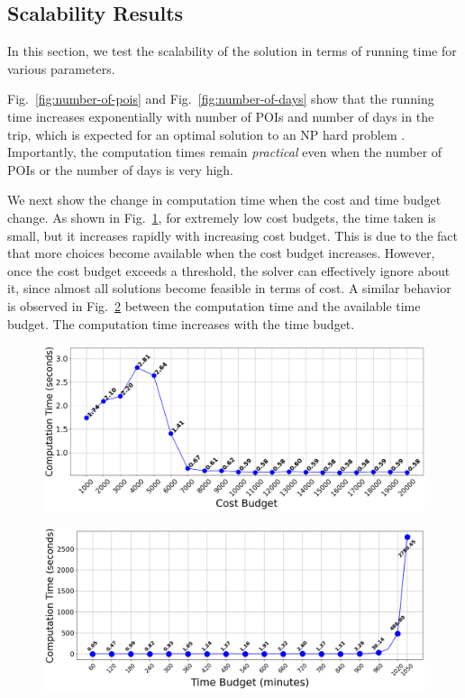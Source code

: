 \subsection{Scalability Results}\label{sec:exp scalability}

In this section, we test the scalability of the \trip solution in terms of running time for various parameters.

Fig.~\ref{fig:number-of-pois} and Fig.~\ref{fig:number-of-days} show that the running time increases exponentially with number of POIs and number of days in the trip, which is expected for an optimal solution to an NP hard problem .
Importantly, the computation times remain \emph{practical} even when the number of POIs or the number of days is very high.

We next show the change in computation time when the cost and time budget change.
As shown in Fig.~\ref{fig:cost-budget}, for extremely low cost budgets, the time taken is small, but it increases rapidly with increasing cost budget. This is due to the fact that more choices become available when the cost budget increases. However, once the cost budget exceeds a threshold, the solver can effectively ignore about it, since almost all solutions become feasible in terms of cost.
A similar behavior is observed in Fig.~\ref{fig:time-budget} between the computation time and the available time budget. The computation time increases with the time budget.

\begin{figure}[t]
    \centering
    \includegraphics[width=\figwidth]{plots/costbudgetvstoc.png}
    \label{fig:cost-budget}
\end{figure}

\begin{figure}[t]
    \centering
    \includegraphics[width=\figwidth]{plots/timebudgetvstoc.png}
    \label{fig:time-budget}
\end{figure}

